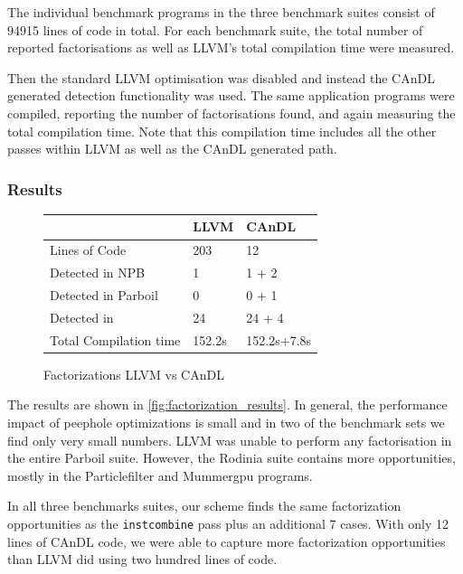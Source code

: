     The individual benchmark programs in the three benchmark
    suites consist of 94915 lines of code in total.
    For each benchmark suite, the total number of reported factorisations as
    well as LLVM's total compilation time were measured.

    Then the standard LLVM optimisation was disabled and instead the CAnDL
    generated detection functionality was used.
    The same application programs were compiled, reporting the number of
    factorisations found, and again measuring the total compilation time.
    Note that this compilation time includes all the other passes within LLVM as
    well as the CAnDL generated path.

\subsubsection{Results}

\begin{figure}[b]
\centering
\begin{tabular}{|l||l|l|}
\hline
         & LLVM  &CAnDL \\
\hline
\hline
Lines of Code & 203 & 12 \\ \hline
Detected in NPB & 1 & 1 + 2 \\
Detected in Parboil & 0 & 0 + 1\\
Detected in  & 24 & 24 + 4\\ \hline
Total Compilation time & 152.2s & 152.2s+7.8s \\ \hline
\hline
\end{tabular}
\vspace{-0.1cm}
\caption{Factorizations LLVM vs CAnDL}
\label{fig:factorization_results}
\end{figure}

    The results are shown in \autoref{fig:factorization_results}.
    In general, the performance impact of peephole optimizations is small
    and in two of the benchmark sets we find only very small numbers.
    LLVM was unable to perform any factorisation in the entire Parboil suite.
    However, the Rodinia suite contains more opportunities, mostly in the
    Particlefilter and Mummergpu programs.

    In all three benchmarks suites, our scheme finds the same factorization
    opportunities as the \texttt{instcombine} pass plus an additional 7 cases.
    With only 12 lines of CAnDL code, we were able to capture more factorization
    opportunities than LLVM did using two hundred lines of code.

